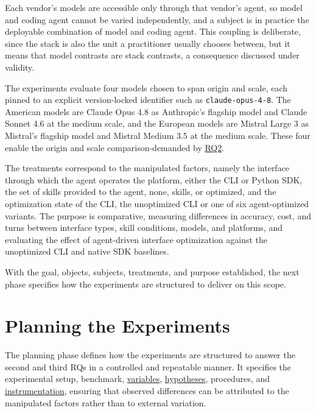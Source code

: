\documentclass[
english,                 %
bibtex,                  %
]{kththesis}
\numberwithin{listing}{chapter}
\begin{document}
Each vendor's models are accessible only through that vendor's agent, so model and coding agent cannot be varied independently, and a subject is in practice the deployable combination of model and coding agent. This coupling is deliberate, since the stack is also the unit a practitioner usually chooses between, but it means that model contrasts are stack contrasts, a consequence discussed under validity.

The experiments evaluate four models chosen to span origin and scale, each pinned to an explicit version-locked identifier such as \texttt{claude-opus-4-8}. The American models are Claude Opus 4.8 as Anthropic's flagship model and Claude Sonnet 4.6 at the medium scale, and the European models are Mistral Large 3 as Mistral's flagship model and Mistral Medium 3.5 at the medium scale. These four enable the origin and scale comparison-demanded by \hyperref[rq2]{RQ2}.

The treatments correspond to the manipulated factors, namely the interface through which the agent operates the platform, either the \gls{CLI} or Python \gls{SDK}, the set of skills provided to the agent, none, skills, or optimized, and the optimization state of the \gls{CLI}, the unoptimized \gls{CLI} or one of six agent-optimized variants. The purpose is comparative, measuring differences in accuracy, cost, and turns between interface types, skill conditions, models, and platforms, and evaluating the effect of agent-driven interface optimization against the unoptimized \gls{CLI} and native \gls{SDK} baselines.

With the goal, objects, subjects, treatments, and purpose established, the next phase specifies how the experiments are structured to deliver on this scope.

\section{Planning the Experiments}
\label{sec:method_planning_the_experiments}
\glsresetall

The planning phase defines how the experiments are structured to answer the second and third \glspl{RQ} in a controlled and repeatable manner. It specifies the experimental setup, benchmark, \hyperref[sec:method_variables]{variables}, \hyperref[sec:method_hypotheses]{hypotheses}, procedures, and \hyperref[sec:method_instrumentation]{instrumentation}, ensuring that observed differences can be attributed to the manipulated factors rather than to external variation.
\end{document}
